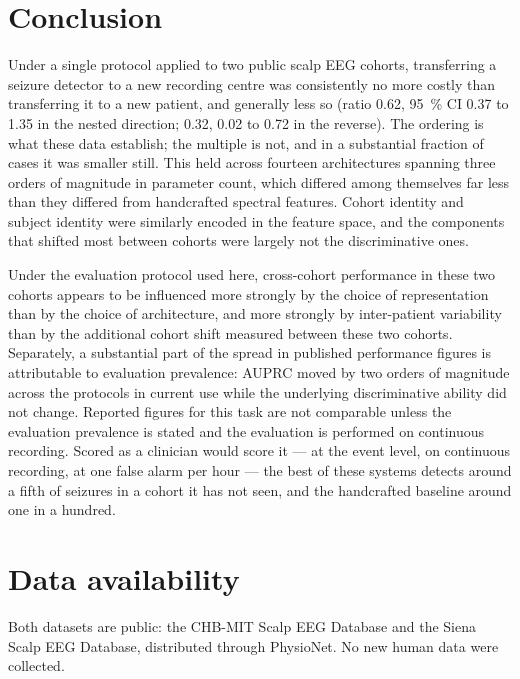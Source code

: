 \documentclass[11pt,a4paper]{article}
\begin{document}
\section{Conclusion}

Under a single protocol applied to two public scalp EEG cohorts, transferring a seizure
detector to a new recording centre was consistently no more costly than
transferring it to a new patient, and generally less so (ratio 0.62,
\SI{95}{\percent} CI 0.37 to 1.35 in the nested direction; 0.32, 0.02 to 0.72
in the reverse). The ordering is what these data establish; the multiple is
not, and in a
substantial fraction of cases it was smaller still. This held across fourteen
architectures spanning three orders of magnitude in parameter count, which
differed among themselves far less than they differed from handcrafted
spectral features. Cohort identity and subject identity were similarly
encoded in the feature space, and the components that shifted most between
cohorts were largely not the discriminative ones.

Under the evaluation protocol used here, cross-cohort performance in these
two cohorts appears to be influenced more strongly by the choice of
representation than by the choice of architecture, and more strongly by
inter-patient variability than by the additional cohort shift measured
between these two cohorts. Separately, a substantial part of the spread in
published performance figures is attributable to evaluation prevalence: AUPRC
moved by two orders of magnitude across the protocols in current use while the
underlying discriminative ability did not change. Reported figures for this
task are not comparable unless the evaluation prevalence is stated and the
evaluation is performed on continuous recording. Scored as a clinician would score
it --- at the event level, on continuous recording, at one false alarm per
hour --- the best of these systems detects around a fifth of seizures in a
cohort it has not seen, and the handcrafted baseline around one in a
hundred.


\section*{Data availability}
Both datasets are public: the CHB-MIT Scalp EEG Database and the Siena Scalp
EEG Database, distributed through PhysioNet. No new human data were collected.
\end{document}
